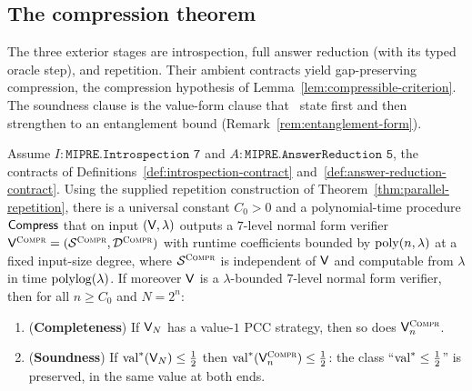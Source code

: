 \subsection{The compression theorem}
\label{sec:ps-compression}

The three exterior stages are introspection, full answer reduction (with its typed
oracle step), and repetition. Their ambient contracts yield gap-preserving compression,
the compression hypothesis of Lemma~\ref{lem:compressible-criterion}. The soundness
clause is the value-form clause that~\cite{JNVWY20} state first and then strengthen to
an entanglement bound (Remark~\ref{rem:entanglement-form}).

\begin{theorem}
\label{thm:compression}
\leanok
Assume $I : \texttt{MIPRE.Introspection 7}$ and
$A : \texttt{MIPRE.AnswerReduction 5}$, the contracts of
Definitions~\ref{def:introspection-contract} and~\ref{def:answer-reduction-contract}.
Using the supplied repetition construction of Theorem~\ref{thm:parallel-repetition},
there is a universal constant $C_0 > 0$ and a polynomial-time
procedure $\mathsf{Compress}$ that on input $(\mathsf{V}, \lambda)$ outputs a $7$-level normal
form verifier $\mathsf{V}^{\textsc{Compr}} = (\mathcal{S}^{\textsc{Compr}}, \mathcal{D}^{\textsc{Compr}})$ with runtime coefficients bounded by
$\mathrm{poly}(n,\lambda)$ at a fixed input-size degree, where $\mathcal{S}^{\textsc{Compr}}$ is independent of
$\mathsf{V}$ and computable from $\lambda$ in time $\mathrm{polylog}(\lambda)$. If moreover
$\mathsf{V}$ is a $\lambda$-bounded $7$-level normal form verifier, then for all $n
\geq C_0$ and $N = 2^n$:
\begin{enumerate}
\item (\textbf{Completeness}) If $\mathsf{V}_N$ has a value-$1$ PCC strategy, then so
  does $\mathsf{V}^{\textsc{Compr}}_n$.
\item (\textbf{Soundness}) If $\mathrm{val}^*(\mathsf{V}_N) \leq \tfrac12$ then
  $\mathrm{val}^*(\mathsf{V}^{\textsc{Compr}}_n) \leq \tfrac12$: the class ``$\mathrm{val}^* \leq \tfrac12$'' is
  preserved, in the same value at both ends.
\end{enumerate}
\end{theorem}
